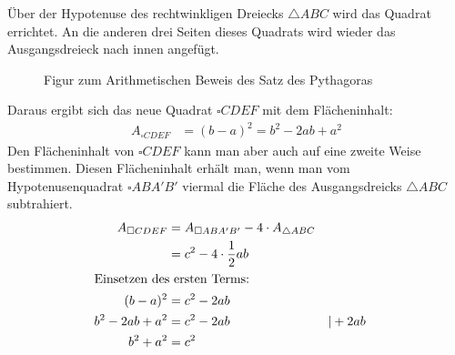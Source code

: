 \begin{bew}

Über der Hypotenuse des rechtwinkligen Dreiecks \(\triangle ABC\) wird das Quadrat errichtet. An die anderen drei Seiten dieses Quadrats wird wieder das Ausgangsdreieck nach innen angefügt.
\begin{figure}\begin{center}
               \end{center}
\caption{Figur zum Arithmetischen Beweis des Satz des Pythagoras}
\end{figure}
Daraus ergibt sich das neue Quadrat \(\square CDEF\) mit dem Flächeninhalt:
\begin{align*}
 A_{\square CDEF} &= (b-a)^2 = b^2 -2ab +a^2
\end{align*}
Den Flächeninhalt von \(\square CDEF\) kann man aber auch auf eine zweite Weise bestimmen. Diesen Flächeninhalt erhält man, wenn man vom Hypotenusenquadrat \(\square ABA'B'\) viermal die Fläche des Ausgangsdreicks \(\triangle ABC\) subtrahiert.
\begin{align*}
 A_{\square CDEF} &= A_{\square ABA'B'} - 4\cdot A_{\triangle ABC} \\
 &= c^2 - 4\cdot \frac{1}{2}ab \\
 \intertext{Einsetzen des ersten Terms:}
 (b-a)^2 &= c^2 - 2ab \\
 b^2 -2ab + a^2 &= c^2 - 2ab && | +2ab \\
 b^2 + a^2 &= c^2
\end{align*}

\end{bew}


